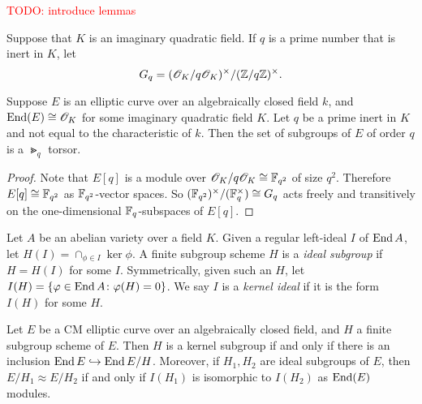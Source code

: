 \documentclass{amsart}
\begin{document}
\textcolor{red}{TODO: introduce lemmas}

\begin{definition}
  Suppose that $K$ is an imaginary quadratic field. If $q$ is a prime number that is inert in $K$, let
  $$G_q=(\mathscr{O}_K/q\mathscr{O}_K)^\times/(\mathbb{Z}/q\mathbb{Z})^\times. $$
\end{definition}

\begin{lemma}\label{lem:c-torsor}
  Suppose $E$ is an elliptic curve over an algebraically closed field $k$, and $\operatorname{End}(E) \cong \mathscr{O}_K$ for some imaginary quadratic field $K$. Let $q$ be a prime inert in $K$ and not equal to the characteristic of $k$. Then the set of subgroups of $E$ of order $q$ is a $\Gt_q$ torsor.
\end{lemma}
\begin{proof}
  Note that $E[q]$ is a module over $\mathscr{O}_K/q\mathscr{O}_K \cong \mathbb{F}_{q^2}$  of size $q^2$. Therefore $E[q] \cong \mathbb{F}_{q^2}$ as $\mathbb{F}_{q^2}$-vector spaces. So $(\mathbb{F}_{q^2})^\times/(\mathbb{F}_q^\times) \cong G_q$ acts freely and transitively on the one-dimensional $\mathbb{F}_q$-subspaces of $E[q]$.
\end{proof}

\begin{definition}\label{def:ker-idl}
  Let $A$ be an abelian variety over a field $K$. Given a regular left-ideal $I$ of $\operatorname{End} A$, let $H(I) = \cap_{\phi \in I}\ker \phi$. A finite subgroup scheme $H$ is a \emph{ideal subgroup} if $H = H(I)$ for some $I$. Symmetrically, given such an $H$, let $I(H) = \{\varphi \in \operatorname{End} A \colon \varphi(H) = 0\}$. We say $I$ is a \emph{kernel ideal} if it is the form $I(H)$ for some $H$.
\end{definition}

\begin{theorem}\label{thm:kani-20b}
  Let $E$ be a CM elliptic curve over an algebraically closed field, and $H$ a finite subgroup scheme of $E$. Then $H$ is a kernel subgroup if and only if there is an inclusion $\operatorname{End} E \hookrightarrow \operatorname{End} E/H$. Moreover, if $H_1,H_2$ are ideal subgroups of $E$, then $E/H_1 \approx E/H_2$ if and only if $I(H_1)$ is isomorphic to $I(H_2)$ as $\operatorname{End}(E)$ modules.
\end{theorem}
\end{document}
